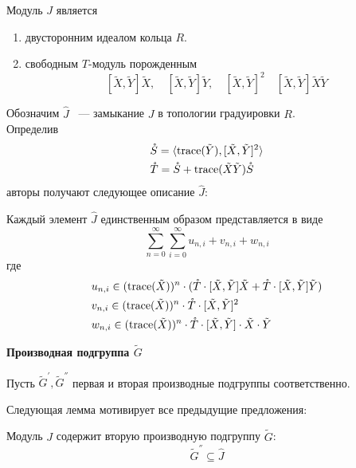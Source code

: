 \vskip 0.1in\noindent
\begin{proposition}
    Модуль $J$ является
    \begin{enumerate}
        \item двусторонним идеалом кольца $R$.
        \item свободным $T$-модуль порожденным \[[\tilde{X}, \tilde{Y}] \tilde{X}, \quad [\tilde{X}, \tilde{Y}] \tilde{Y}, \quad [\tilde{X}, \tilde{Y}]^2 \quad [\tilde{X}, \tilde{Y}]\tilde{X}\tilde{Y}\]
    \end{enumerate}
\end{proposition}
\vskip 0.1in\noindent
Обозначим $\hat{J}$ ~--- замыкание $J$ в топологии градуировки $R$.\\
Определив
\begin{align*}
    & \mathring{S} = \langle \mathrm{trace}(\tilde{Y}), [\tilde{X}, \tilde{Y}]^2 \rangle \\
    & \mathring{T} = \mathring{S} + \mathrm{trace}(\tilde{X}\tilde{Y}) \mathring{S}
\end{align*}
авторы получают следующее описание $\hat{J}$:
\vskip 0.1in\noindent
\begin{proposition}
    Каждый элемент $\hat{J}$ единственным образом представляется в виде
    \[
        \sum\limits_{n=0}^{\infty}\sum\limits_{i=0}^{\infty}
        u_{n,i} + v_{n,i} + w_{n,i}
    \]
    где
    \begin{align*}
        & u_{n,i} \in (\mathrm{trace}(\tilde{X}))^n \cdot (\mathring{T}\cdot[\tilde{X}, \tilde{Y}]\tilde{X} + \mathring{T}\cdot[\tilde{X}, \tilde{Y}]\tilde{Y}) \\
        & v_{n,i} \in (\mathrm{trace}(\tilde{X}))^n \cdot \mathring{T} \cdot [\tilde{X}, \tilde{Y}]^2 \\
        & w_{n,i} \in (\mathrm{trace}(\tilde{X}))^n \cdot \mathring{T} \cdot [\tilde{X}, \tilde{Y}]\cdot \tilde{X} \cdot \tilde{Y}
    \end{align*}
\end{proposition}

\vskip 0.1in\noindent
{\large\textbf{Производная подгруппа $\tilde{G}$}}

Пусть $\tilde{G}^{'}, \tilde{G}^{''}$ первая и вторая производные подгруппы соответственно.

Следующая лемма мотивирует все предыдущие предложения:
\begin{lemma}
    Модуль $J$ содержит вторую производную подгруппу $\tilde{G}$:
    \[\tilde{G}^{''}\subseteq \hat{J}\]
\end{lemma}


